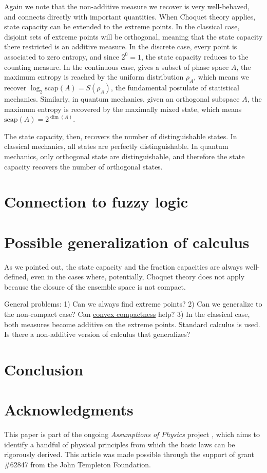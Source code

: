\documentclass[10pt,twocolumn, nofootinbib]{revtex4-2}
\newcommand\capacity{\mathrm{scap}}
\begin{document}
Again we note that the non-additive measure we recover is very well-behaved, and connects directly with important quantities. When Choquet theory applies, state capacity can be extended to the extreme points. In the classical case, disjoint sets of extreme points will be orthogonal, meaning that the state capacity there restricted is an additive measure. In the discrete case, every point is associated to zero entropy, and since $2^0=1$, the state capacity reduces to the counting measure. In the continuous case, gives a subset of phase space $A$, the maximum entropy is reached by the uniform distribution $\rho_A$, which means we recover $\log_2 \capacity(A) = S(\rho_A)$, the fundamental postulate of statistical mechanics. Similarly, in quantum mechanics, given an orthogonal subspace $A$, the maximum entropy is recovered by the maximally mixed state, which means $\capacity(A) = 2^{\dim(A)}$.

The state capacity, then, recovers the number of distinguishable states. In classical mechanics, all states are perfectly distinguishable. In quantum mechanics, only orthogonal state are distinguishable, and therefore the state capacity recovers the number of orthogonal states.

\section{Connection to fuzzy logic}



\section{Possible generalization of calculus}

As we pointed out, the state capacity and the fraction capacities are always well-defined, even in the cases where, potentially, Choquet theory does not apply because the closure of the ensemble space is not compact.

General problems:
1) Can we always find extreme points?
2) Can we generalize to the non-compact case? Can \href{https://en.wikipedia.org/wiki/Krein%E2%80%93Milman_theorem#convex_compactness}{convex compactness} help?
3) In the classical case, both measures become additive on the extreme points. Standard calculus is used. Is there a non-additive version of calculus that generalizes?

\section{Conclusion}



\section*{Acknowledgments}
This paper is part of the ongoing \textit{Assumptions of Physics} project \cite{aop-book}, which aims to identify a handful of physical principles from which the basic laws can be rigorously derived. This article was made possible through the support of grant \#62847 from the John Templeton Foundation.




\newcommand{\pj}[1] {\underbar{$#1$}}
\end{document}
